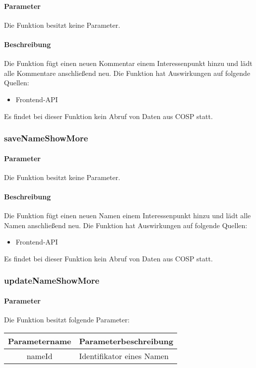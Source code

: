 \paragraph{Parameter} Die Funktion besitzt keine Parameter.
\paragraph{Beschreibung} Die Funktion fügt einen neuen Kommentar einem Interessenpunkt hinzu und lädt alle Kommentare anschließend neu. Die Funktion hat Auswirkungen auf folgende Quellen:
\begin{itemize}
	\item Frontend-API
\end{itemize}
Es findet bei dieser Funktion kein Abruf von Daten aus {\glqq COSP\grqq} statt.
\subsubsection{saveNameShowMore}
\paragraph{Parameter} Die Funktion besitzt keine Parameter.
\paragraph{Beschreibung} Die Funktion fügt einen neuen Namen einem Interessenpunkt hinzu und lädt alle Namen anschließend neu. Die Funktion hat Auswirkungen auf folgende Quellen:
\begin{itemize}
	\item Frontend-API
\end{itemize}
Es findet bei dieser Funktion kein Abruf von Daten aus {\glqq COSP\grqq} statt.
\subsubsection{updateNameShowMore}
\paragraph{Parameter} Die Funktion besitzt folgende Parameter:
\begin{table}[H]
	\begin{tabular}{|c|p{11cm}|}
		\hline
		\textbf{Parametername} & \textbf{Parameterbeschreibung} \\ \hline
		nameId & Identifikator eines Namen \\ \hline
	\end{tabular}
\end{table}
